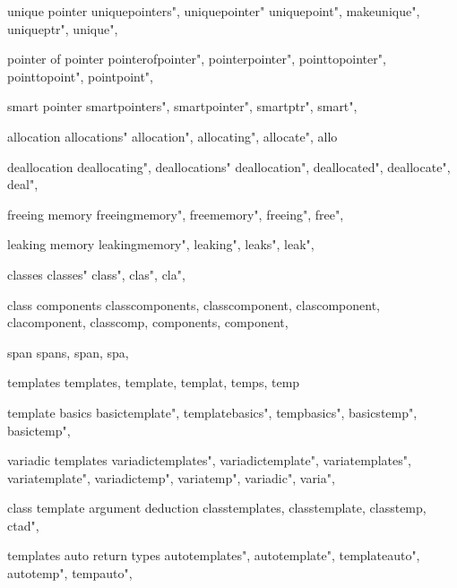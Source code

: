          unique pointer
        uniquepointers", 
        uniquepointer"
        uniquepoint", 
        makeunique",
        uniqueptr",
        unique",
        
         pointer of pointer
        pointerofpointer", 
        pointerpointer",
        pointtopointer",
        pointtopoint",
        pointpoint",
        
         smart pointer
        smartpointers",
        smartpointer", 
        smartptr", 
        smart",
        
         allocation 
        allocations"
        allocation",
        allocating",
        allocate",
        allo
        
         deallocation 
        deallocating",
        deallocations"
        deallocation",
        deallocated", 
        deallocate",
        deal",
        
         freeing memory 
        freeingmemory",  
        freememory",  
        freeing", 
        free", 
        
         leaking memory 
        leakingmemory", 
        leaking", 
        leaks", 
        leak", 
        
         classes 
        classes"
        class",
        clas",
        cla",
        
         class components 
        classcomponents,  
        classcomponent,  
        clascomponent,  
        clacomponent,  
        classcomp,  
        components,  
        component,  
        
         span 
        spans,  
        span,  
        spa,  
        
         templates
        templates,
        template,
        templat,
        temps,
        temp
        
         template basics 
        basictemplate",  
        templatebasics",  
        tempbasics",  
        basicstemp",  
        basictemp",  
        
         variadic templates
        variadictemplates",  
        variadictemplate",  
        variatemplates",  
        variatemplate",  
        variadictemp",  
        variatemp",  
        variadic",  
        varia",  
        
         class template argument deduction 
        classtemplates,  
        classtemplate,  
        classtemp,  
        ctad", 
        
         templates auto return types 
        autotemplates",  
        autotemplate",  
        templateauto",  
        autotemp",  
        tempauto",  
        
